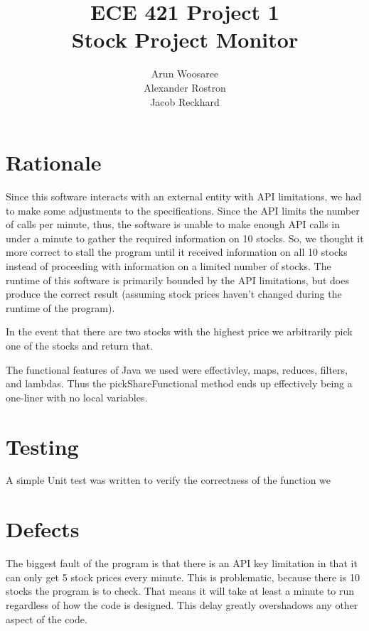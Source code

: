 \documentclass[letterpaper]{article}
\title{ECE 421 Project 1\\
Stock Project Monitor}
\author{Arun Woosaree\\
Alexander Rostron\\
Jacob Reckhard
}
\begin{document}
\maketitle %

\section{Rationale}

Since this software interacts with an external entity with API
limitations, we had to make some adjustments to the
specifications. Since the API limits the number of calls per minute,
thus, the software is unable to make enough API calls in under a
minute to gather the required information on 10 stocks. So, we thought
it more correct to stall the program until it received information on
all 10 stocks instead of proceeding with information on a limited
number of stocks. The runtime of this software is primarily bounded by
the API limitations, but does produce the correct result (assuming
stock prices haven't changed during the runtime of the program).

In the event that there are two stocks with the highest price we
arbitrarily pick one of the stocks and return that.

The functional features of Java we used were effectivley, maps,
reduces, filters, and lambdas. Thus the pickShareFunctional method
ends up effectively being a one-liner with no local variables.

\section{Testing}

A simple Unit test was written to verify the correctness of the
function we

\section{Defects}

The biggest fault of the program is that there is an API key
limitation in that it can only get 5 stock prices every minute. This
is problematic, because there is 10 stocks the program is to
check. That means it will take at least a minute to run regardless of
how the code is designed. This delay greatly overshadows any other
aspect of the code.
\end{document}
